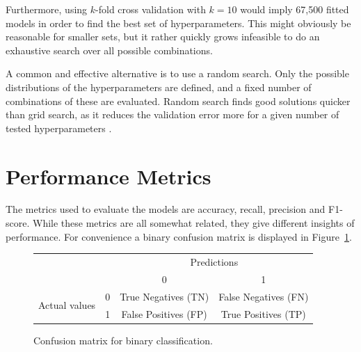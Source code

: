 Furthermore, using $k$-fold cross validation with $k=10$ would imply 67,500 fitted models in order to find the best set of hyperparameters. This might obviously be reasonable for smaller sets, but it rather quickly grows infeasible to do an exhaustive search over all possible combinations. 

A common and effective alternative is to use a random search. Only the possible distributions of the hyperparameters are defined, and a fixed number of combinations of these are evaluated. Random search finds good solutions quicker than grid search, as it reduces the validation error more for a given number of tested hyperparameters \citep{Goodfellow-et-al-2016}. 

\section{Performance Metrics}
The metrics used to evaluate the models are accuracy, recall, precision and F1-score. While these metrics are all somewhat related, they give different insights of performance. For convenience a binary confusion matrix is displayed in Figure~\ref{fig:confmat}. 

\begin{figure}[ht]
\centering
\begin{tabular}{cccc}
     & & \multicolumn{2}{c}{Predictions} \\
     & & \multicolumn{1}{|c|}{0} & \multicolumn{1}{c|}{1}\\
      \cline{2-4}
     \multirow{2}{*}{Actual values} & 0 & \multicolumn{1}{|c|}{True Negatives (TN)} &  \multicolumn{1}{c|}{False Negatives (FN)} \\
      & 1 & \multicolumn{1}{|c|}{False Positives (FP)} & \multicolumn{1}{c|}{True Positives (TP)} \\ 
\end{tabular}
\caption{Confusion matrix for binary classification.}
\label{fig:confmat}
\end{figure}

